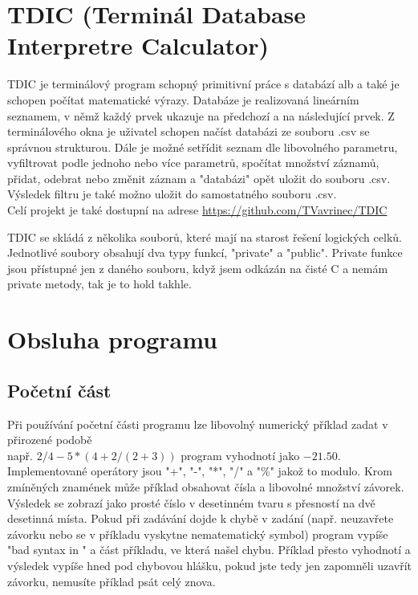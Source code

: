 \documentclass{article}
\begin{document}
\section{TDIC (Terminál Database Interpretre Calculator)}
TDIC je terminálový program schopný primitivní práce s databází alb a také je schopen počítat matematické výrazy.
Databáze je realizovaná lineárním seznamem, v němž každý prvek ukazuje na předchozí a na následující prvek.
Z terminálového okna je uživatel schopen načíst databázi ze souboru .csv se správnou strukturou.
Dále je možné setřídit seznam dle libovolného parametru, vyfiltrovat podle jednoho nebo více parametrů, spočítat množství záznamů, přidat, odebrat nebo změnit záznam a "databázi" opět uložit do souboru .csv.
Výsledek filtru je také možno uložit do samostatného souboru .csv.\\
Celí projekt je také dostupní na adrese \url{https://github.com/TVavrinec/TDIC}

TDIC se skládá z několika souborů, které mají na starost řešení logických celků.
Jednotlivé soubory obsahují dva typy funkcí, "private" a "public".
Private funkce jsou přístupné jen z daného souboru, když jsem odkázán na čisté C a nemám private metody, tak je to hold takhle.

\section{Obsluha programu}
\subsection{Početní část}
Při používání početní části programu lze libovolný numerický příklad zadat v přirozené podobě \\např. \(2/4-5*(4+2/(2+3))\) program vyhodnotí jako \(-21.50\).
Implementované operátory jsou "+", "-", "*", "/" a "\%" jakož to modulo.
Krom zmíněných znamének může příklad obsahovat čísla a libovolné množství závorek.
Výsledek se zobrazí jako prosté číslo v desetinném tvaru s přesností na dvě desetinná místa.
Pokud při zadávání dojde k chybě v zadání (např. neuzavřete závorku nebo se v příkladu vyskytne nematematický symbol) program vypíše "bad syntax in " a část příkladu, ve která našel chybu.
Příklad přesto  vyhodnotí a výsledek vypíše hned pod chybovou hlášku, pokud jste tedy jen zapomněli uzavřít závorku, nemusíte příklad psát celý znova.
\end{document}

